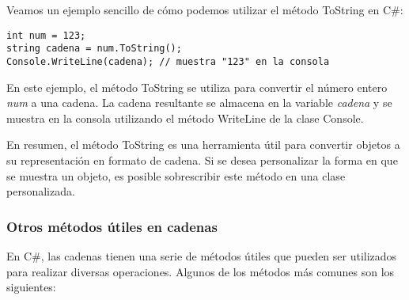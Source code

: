 \documentclass[executivepaper]{article}
\begin{document}
Veamos un ejemplo sencillo de cómo podemos utilizar el método ToString en C\#:

\begin{lstlisting}[language={[Sharp]C}]
int num = 123;
string cadena = num.ToString();
Console.WriteLine(cadena); // muestra "123" en la consola
\end{lstlisting}

En este ejemplo, el método ToString se utiliza para convertir el número entero \textit{num} a una cadena. La cadena resultante se almacena en la variable \textit{cadena} y se muestra en la consola utilizando el método WriteLine de la clase Console.

En resumen, el método ToString es una herramienta útil para convertir objetos a su representación en formato de cadena. Si se desea personalizar la forma en que se muestra un objeto, es posible sobrescribir este método en una clase personalizada.

\subsubsection*{Otros métodos útiles en cadenas}

En C\#, las cadenas tienen una serie de métodos útiles que pueden ser utilizados para realizar diversas operaciones. Algunos de los métodos más comunes son los siguientes:
\end{document}
